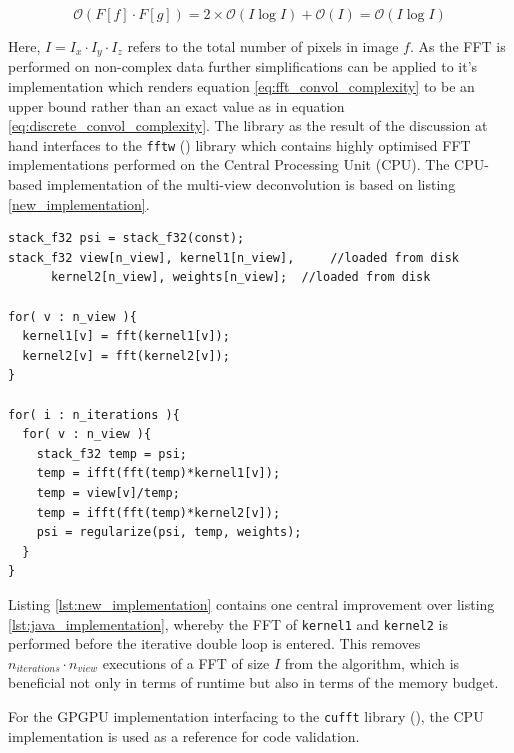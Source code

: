 \begin{equation}
  \label{eq:fft_convol_complexity}
  \mathcal{O}(F[f] \cdot F[g]) = 2\times\mathcal{O}(I\log I) + \mathcal{O}(I) = \mathcal{O}(I\log I)
\end{equation}

Here, $I = I_{x} \cdot I_{y} \cdot I_{z}$ refers to the total number of pixels in image $f$. As the FFT is performed on non-complex data further simplifications can be applied to it's implementation which renders equation \ref{eq:fft_convol_complexity} to be an upper bound rather than an exact value as in equation \ref{eq:discrete_convol_complexity}. The library as the result of the discussion at hand interfaces to the \texttt{fftw} (\cite{FFTW05}) library which contains highly optimised FFT implementations performed on the Central Processing Unit (CPU). The CPU-based implementation of the multi-view deconvolution is based on listing \ref{new_implementation}.

\clearpage

\begin{lstlisting}[caption={Optimized CPU Implementation of Multi-View Deconvolution. All FFT are explicitely stated \texttt{fft} as well as the corresponding normalized inverse operations \texttt{ifft}. },label={lst:new_implementation}]
stack_f32 psi = stack_f32(const);
stack_f32 view[n_view], kernel1[n_view],     //loaded from disk
	  kernel2[n_view], weights[n_view];  //loaded from disk

for( v : n_view ){
  kernel1[v] = fft(kernel1[v]);
  kernel2[v] = fft(kernel2[v]);
}

for( i : n_iterations ){
  for( v : n_view ){
    stack_f32 temp = psi;
    temp = ifft(fft(temp)*kernel1[v]);
    temp = view[v]/temp;
    temp = ifft(fft(temp)*kernel2[v]);
    psi = regularize(psi, temp, weights);
  }
}
\end{lstlisting}

Listing \ref{lst:new_implementation} contains one central improvement over listing \ref{lst:java_implementation}, whereby the FFT of \texttt{kernel1} and \texttt{kernel2} is performed before the iterative double loop is entered. This removes $n_{iterations}\cdot n_{view}$ executions of a FFT of size $I$ from the algorithm, which is beneficial not only in terms of runtime but also in terms of the memory budget.

For the GPGPU implementation interfacing to the \texttt{cufft} library (\cite{cufft}), the CPU implementation is used as a reference for code validation.
